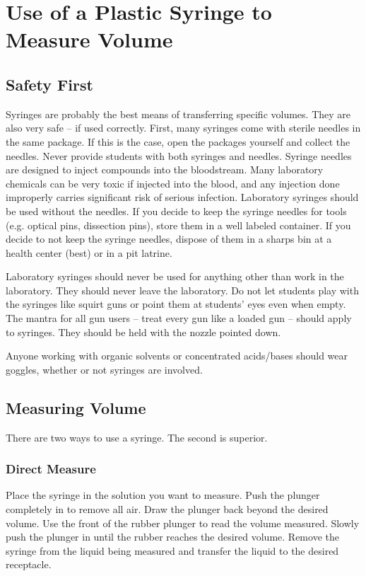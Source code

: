 \chapter{Use of a Plastic Syringe to Measure Volume}
\label{cha:usesyringe}

\section{Safety First}

Syringes are probably the best means of transferring specific volumes. They are also very safe -- if used correctly. First, many syringes come with sterile needles in the same package. If this is the case, open the packages yourself and collect the needles. Never provide students with both syringes and needles. Syringe needles are designed to inject compounds into the bloodstream. Many laboratory chemicals can be very toxic if injected into the blood, and any injection done improperly carries significant risk of serious infection. Laboratory syringes should be used without the needles. If you decide to keep the syringe needles for tools (e.g. optical pins, dissection pins), store them in a well labeled container. If you decide to not keep the syringe needles, dispose of them in a sharps bin at a health center (best) or in a pit latrine.

Laboratory syringes should never be used for anything other than work in the laboratory. They should never leave the laboratory. Do not let students play with the syringes like squirt guns or point them at students’ eyes even when empty. The mantra for all gun users -- treat every gun like a loaded gun -- should apply to syringes. They should be held with the nozzle pointed down.

Anyone working with organic solvents or concentrated acids/bases should wear goggles, whether or not syringes are involved.

\section{Measuring Volume}

There are two ways to use a syringe. The second is superior.

\subsection{Direct Measure}
Place the syringe in the solution you want to measure. Push the plunger completely in to remove all air. Draw the plunger back beyond the desired volume. Use the front of the rubber plunger to read the volume measured. Slowly push the plunger in until the rubber reaches the desired volume. Remove the syringe from the liquid being measured and transfer the liquid to the desired receptacle.

